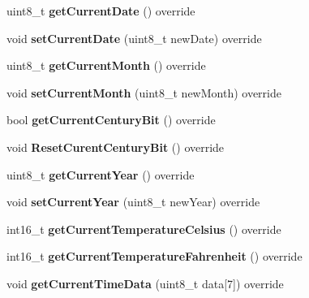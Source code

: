 \begin{DoxyCompactItemize}
uint8\+\_\+t {\bfseries get\+Current\+Date} () override
\item 
\mbox{\label{class_d_s3231_a597a0d5cb33f8b60f81dba9050ca1363}} 
void {\bfseries set\+Current\+Date} (uint8\+\_\+t new\+Date) override
\item 
\mbox{\label{class_d_s3231_a8d7a965802afacc16b4d5af86e0ed11e}} 
uint8\+\_\+t {\bfseries get\+Current\+Month} () override
\item 
\mbox{\label{class_d_s3231_a122611bf693cdd538178b99b893a7115}} 
void {\bfseries set\+Current\+Month} (uint8\+\_\+t new\+Month) override
\item 
\mbox{\label{class_d_s3231_a38dfc1567d3419d5aeecd2062d4121c7}} 
bool {\bfseries get\+Current\+Century\+Bit} () override
\item 
\mbox{\label{class_d_s3231_a6477bd1bb91d3df6a088c369692f46a3}} 
void {\bfseries Reset\+Curent\+Century\+Bit} () override
\item 
\mbox{\label{class_d_s3231_a28a340b10b045ad1e8b94532a57c3759}} 
uint8\+\_\+t {\bfseries get\+Current\+Year} () override
\item 
\mbox{\label{class_d_s3231_a59a60a725581bc8e5dcf857ea52c6281}} 
void {\bfseries set\+Current\+Year} (uint8\+\_\+t new\+Year) override
\item 
\mbox{\label{class_d_s3231_abd46c1cf5f5c78e3222c3677e70a1272}} 
int16\+\_\+t {\bfseries get\+Current\+Temperature\+Celsius} () override
\item 
\mbox{\label{class_d_s3231_aa31acb133cc63aa7a2a25eda6244c9df}} 
int16\+\_\+t {\bfseries get\+Current\+Temperature\+Fahrenheit} () override
\item 
\mbox{\label{class_d_s3231_a0ca41c2242367c5ff1424d1b12f909c5}} 
void {\bfseries get\+Current\+Time\+Data} (uint8\+\_\+t data\mbox{[}7\mbox{]}) override
\item 
\mbox{\label{class_d_s3231_a04e087a918d2d48b0cdd2e3c6c2f595f}} 

\end{DoxyCompactItemize}
